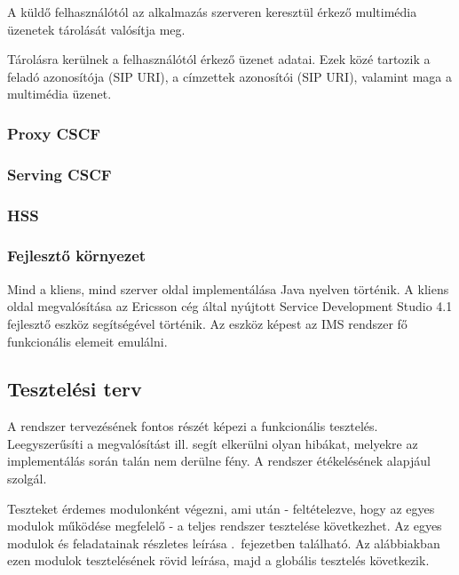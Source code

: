 A küldő felhasználótól az alkalmazás szerveren keresztül érkező
multimédia üzenetek tárolását valósítja meg.

Tárolásra kerülnek a felhasználótól érkező üzenet adatai. Ezek közé tartozik
a feladó azonosítója (SIP URI), a címzettek azonosítói (SIP URI), valamint maga a multimédia üzenet.

\subsubsection{Proxy CSCF}
\label{sec:p_cscf}

\subsubsection{Serving CSCF}
\label{sec:s_cscf}

\subsubsection{HSS}
\label{sec:hss}

\subsubsection{Fejlesztő környezet}

Mind a kliens, mind szerver oldal implementálása Java nyelven történik. A kliens oldal megvalósítása az Ericsson cég által nyújtott Service Development Studio 4.1 fej\-lesz\-tő eszköz segítségével történik. Az eszköz képest az IMS rendszer fő funkcionális elemeit emulálni.


\subsection{Tesztelési terv}
\label{sec:tesztelesi_terv}

A rendszer tervezésének fontos részét képezi a funkcionális tesztelés. Leegyszerűsíti a megvalósítást ill. segít elkerülni olyan hibákat, melyekre az imp\-le\-men\-tá\-lás során talán nem derülne fény. A rendszer étékelésének alapjául szolgál.

Teszteket érdemes modulonként végezni, ami után - feltételezve, hogy az egyes mo\-du\-lok működése megfelelő - a teljes rendszer tesztelése következhet. %
Az egyes modulok és feladatainak részletes leírása .~fejezetben található. Az alábbiakban ezen modulok tesztelésének rövid leírása, majd a globális tesztelés következik.

